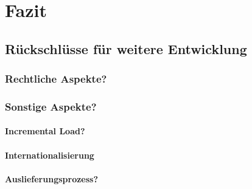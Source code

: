 \chapter{Fazit}
\label{fazit}
\minitoc\pagebreak


\section{Rückschlüsse für weitere Entwicklung}

\subsection{Rechtliche Aspekte?}
\label{sub:recht}



\subsection{Sonstige Aspekte?}

\subsubsection{Incremental Load?}
\label{sub:incremental}
\subsubsection{Internationalisierung}
\subsubsection{Auslieferungsprozess?}





